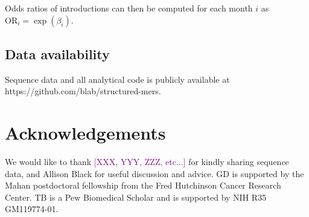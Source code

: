 \documentclass[11pt,oneside,letterpaper]{article}
\def\tbc#1{\textcolor{purple}{[#1]}}
\begin{document}
Odds ratios of introductions can then be computed for each month $i$ as $\text{OR}_i = \exp(\beta_i)$.

\subsection*{Data availability}
Sequence data and all analytical code is publicly available at https://github.com/blab/structured-mers.

\section*{Acknowledgements}
We would like to thank \tbc{XXX, YYY, ZZZ, etc...} for kindly sharing sequence data, and Allison Black for useful discussion and advice.
GD is supported by the Mahan postdoctoral fellowship from the Fred Hutchinson Cancer Research Center.
TB is a Pew Biomedical Scholar and is supported by NIH R35 GM119774-01.





\newpage

\setcounter{figure}{0}
\setcounter{table}{0}
\renewcommand{\thefigure}{S\arabic{figure}}
\renewcommand{\thetable}{S\arabic{table}}
\end{document}
